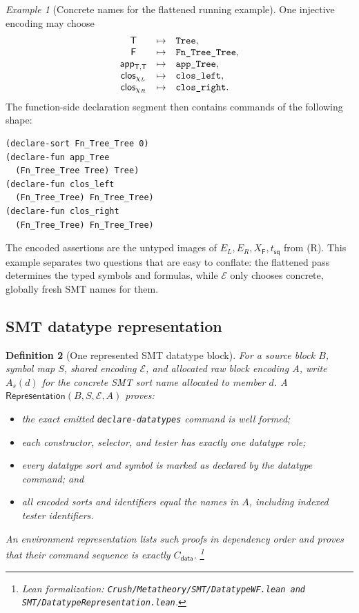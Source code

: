 \documentclass[11pt]{article}
\newtheorem{definition}{Definition}[section]
\theoremstyle{remark}
\newtheorem{example}[definition]{Example}
\newcommand{\leanfiles}[1]{\footnote{Lean formalization: \texttt{Crush/Metatheory/#1}.}}
\newcommand{\clos}{\mathsf{clos}}
\newcommand{\app}{\mathsf{app}}
\newcommand{\TreeTy}{\mathsf{T}}
\newcommand{\TreeFun}{\mathsf{F}}
\begin{document}
\begin{example}[Concrete names for the flattened running example]
One injective encoding may choose
\[
\begin{array}{c@{\quad\mapsto\quad}l}
 \TreeTy & \texttt{Tree},\\
 \TreeFun & \texttt{Fn\_Tree\_Tree},\\
 \app_{\TreeTy,\TreeTy} & \texttt{app\_Tree},\\
 \clos_{\chi_L} & \texttt{clos\_left},\\
 \clos_{\chi_R} & \texttt{clos\_right}.
\end{array}
\]
The function-side declaration segment then contains commands of the following
shape:
\begin{verbatim}
(declare-sort Fn_Tree_Tree 0)
(declare-fun app_Tree
  (Fn_Tree_Tree Tree) Tree)
(declare-fun clos_left
  (Fn_Tree_Tree) Fn_Tree_Tree)
(declare-fun clos_right
  (Fn_Tree_Tree) Fn_Tree_Tree)
\end{verbatim}
The encoded assertions are the untyped images of
$E_L,E_R,X_{\TreeFun},t_{\mathsf{sq}}$ from (R). This example separates two
questions that are easy to conflate: the flattened pass determines the typed
symbols and formulas, while $\mathcal E$ only chooses concrete, globally fresh
SMT names for them.
\end{example}

\subsection{SMT datatype representation}

\begin{definition}[One represented SMT datatype block]
For a source block $B$, symbol map $S$, shared encoding $\mathcal E$, and
allocated raw block encoding $A$, write $A_s(d)$ for the concrete SMT sort
name allocated to member $d$. A
$\mathsf{Representation}(B,S,\mathcal E,A)$ proves:
\begin{itemize}[leftmargin=*]
 \item the exact emitted \texttt{declare-datatypes} command is well formed;
 \item each constructor, selector, and tester has exactly one datatype role;
 \item every datatype sort and symbol is marked as declared by the datatype command; and
 \item all encoded sorts and identifiers equal the names in $A$, including
       indexed tester identifiers.
\end{itemize}
An environment representation lists such proofs in dependency order and
proves that their command sequence is exactly $C_{\mathsf{data}}$.
\leanfiles{SMT/DatatypeWF.lean and SMT/DatatypeRepresentation.lean}
\end{definition}
\end{document}
